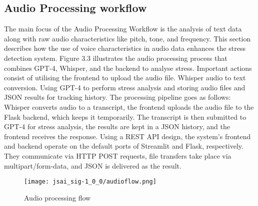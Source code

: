 \documentclass[a4j, twocolumn]{article}
\begin{document}
\subsection{Audio Processing workflow} 
The main focus of the Audio Processing Workflow is the analysis of text data along with raw audio characteristics like pitch, tone, and frequency. This section describes how the use of voice characteristics in audio data enhances the stress detection system. Figure 3.3 illustrates the audio processing process that combines GPT-4, Whisper, and the backend to analyse stress. Important actions consist of utilising the frontend to upload the audio file. Whisper audio to text conversion. Using GPT-4 to perform stress analysis and storing audio files and JSON results for tracking history. The processing pipeline goes as follows: Whisper converts audio to a transcript, the frontend uploads the audio file to the Flask backend, which keeps it temporarily. The transcript is then submitted to GPT-4 for stress analysis, the results are kept in a JSON history, and the frontend receives the response. Using a REST API design, the system's frontend and backend operate on the default ports of Streamlit and Flask, respectively. They communicate via HTTP POST requests, file transfers take place via multipart/form-data, and JSON is delivered as the result. 
\vspace{10pt} %
\begin{figure}[H]
    \centering
    \texttt{[image: jsai\_sig-1\_0\_0/audioflow.png]}
    \caption{Audio processing flow}
    \label{fig:system_architecture}
\end{figure}
\vspace{10pt} %
\end{document}
